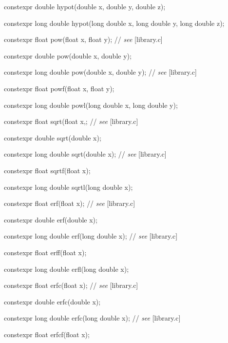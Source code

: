 \documentclass[prd,twocolumn,amsmath,amssymb,nofootinbib,eqsecnum]{revtex4-1}
\newcommand{\highlight}[1]{{\color{red} #1}}
\newcommand{\stdcomment}[1]{{// {\it see} [#1]}}
\begin{document}
{\highlight{constexpr} double hypot(double x, double y, double z);

\highlight{constexpr} long double hypot(long double x, long double y, long double z);

\vspace{2ex}

\highlight{constexpr} float pow(float x, float y); \stdcomment{library.c}

\highlight{constexpr} double pow(double x, double y);

\highlight{constexpr} long double pow(double x, double y); \stdcomment{library.c}

\highlight{constexpr} float powf(float x, float y);

\highlight{constexpr} long double powl(long double x, long double y);

\vspace{2ex}


\highlight{constexpr} float sqrt(float x,; \stdcomment{library.c}

\highlight{constexpr} double sqrt(double x);

\highlight{constexpr} long double sqrt(double x); \stdcomment{library.c}

\highlight{constexpr} float sqrtf(float x);

\highlight{constexpr} long double sqrtl(long double x);

\vspace{2ex}


\highlight{constexpr} float erf(float x); \stdcomment{library.c}

\highlight{constexpr} double erf(double x);

\highlight{constexpr} long double erf(long double x); \stdcomment{library.c}

\highlight{constexpr} float erff(float x);

\highlight{constexpr} long double erfl(long double x);

\vspace{2ex}

\highlight{constexpr} float erfc(float x); \stdcomment{library.c}

\highlight{constexpr} double erfc(double x);

\highlight{constexpr} long double erfc(long double x); \stdcomment{library.c}

\highlight{constexpr} float erfcf(float x);

}
\end{document}
